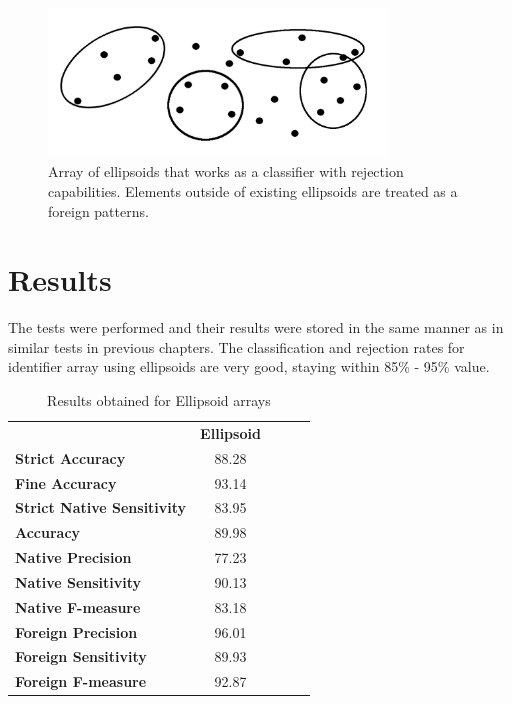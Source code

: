 \begin{figure}[htp]
	\centering
	\includegraphics[width=0.8\textwidth]{Figures/ellipsoids_array_example.png}
	\caption{ Array of ellipsoids that works as a classifier with rejection capabilities. Elements outside of existing ellipsoids are treated as a foreign patterns. }
	\label{fig:ellipsoids_array}\vspace{-3pt}
\end{figure}

\section{Results}

The tests were performed and their results were stored in the same manner as in similar tests in previous chapters. The classification and rejection rates for identifier array using ellipsoids are very good, staying within 85\% - 95\% value.

\begin{table}[htp]
	\centering
	\caption{Results obtained for Ellipsoid arrays}
	\label{ellipsoid_arrays_results}
	\begin{tabular}{l|c|lll}
		\cline{2-2}
		& \multicolumn{1}{l|}{\textbf{Ellipsoid}} &  &  &  \\ \cline{1-2}
		\multicolumn{1}{|l|}{\textbf{Strict Accuracy}}           & 88.28 \\ \cline{1-2}
		\multicolumn{1}{|l|}{\textbf{Fine Accuracy}}             & 93.14 \\ \cline{1-2}
		\multicolumn{1}{|l|}{\textbf{Strict Native Sensitivity}} & 83.95 \\ \cline{1-2}
		\multicolumn{1}{|l|}{\textbf{Accuracy}}                  & 89.98 \\ \cline{1-2}
		\multicolumn{1}{|l|}{\textbf{Native Precision}}          & 77.23 \\ \cline{1-2}
		\multicolumn{1}{|l|}{\textbf{Native Sensitivity}}        & 90.13 \\ \cline{1-2}
		\multicolumn{1}{|l|}{\textbf{Native F-measure}}          & 83.18 \\ \cline{1-2}
		\multicolumn{1}{|l|}{\textbf{Foreign Precision}}         & 96.01 \\ \cline{1-2}
		\multicolumn{1}{|l|}{\textbf{Foreign Sensitivity}}       & 89.93 \\ \cline{1-2}
		\multicolumn{1}{|l|}{\textbf{Foreign F-measure}}         & 92.87 \\ \cline{1-2}
	\end{tabular}
\end{table}

